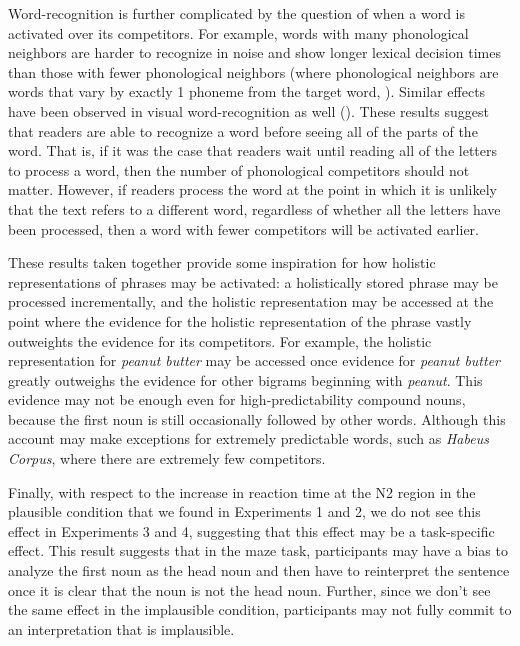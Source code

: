 \documentclass[
  12pt,
  letterpaper,
]{scrreport}
\begin{document}
Word-recognition is further complicated by the question of when a word
is activated over its competitors. For example, words with many
phonological neighbors are harder to recognize in noise and show longer
lexical decision times than those with fewer phonological neighbors
(where phonological neighbors are words that vary by exactly 1 phoneme
from the target word,
). Similar effects have been observed in visual word-recognition as
well (). These
results suggest that readers are able to recognize a word before seeing
all of the parts of the word. That is, if it was the case that readers
wait until reading all of the letters to process a word, then the number
of phonological competitors should not matter. However, if readers
process the word at the point in which it is unlikely that the text
refers to a different word, regardless of whether all the letters have
been processed, then a word with fewer competitors will be activated
earlier.

These results taken together provide some inspiration for how holistic
representations of phrases may be activated: a holistically stored
phrase may be processed incrementally, and the holistic representation
may be accessed at the point where the evidence for the holistic
representation of the phrase vastly outweights the evidence for its
competitors. For example, the holistic representation for \emph{peanut
butter} may be accessed once evidence for \emph{peanut butter} greatly
outweighs the evidence for other bigrams beginning with \emph{peanut}.
This evidence may not be enough even for high-predictability compound
nouns, because the first noun is still occasionally followed by other
words. Although this account may make exceptions for extremely
predictable words, such as \emph{Habeus Corpus}, where there are
extremely few competitors.

Finally, with respect to the increase in reaction time at the N2 region
in the plausible condition that we found in Experiments 1 and 2, we do
not see this effect in Experiments 3 and 4, suggesting that this effect
may be a task-specific effect. This result suggests that in the maze
task, participants may have a bias to analyze the first noun as the head
noun and then have to reinterpret the sentence once it is clear that the
noun is not the head noun. Further, since we don't see the same effect
in the implausible condition, participants may not fully commit to an
interpretation that is implausible.
\end{document}
